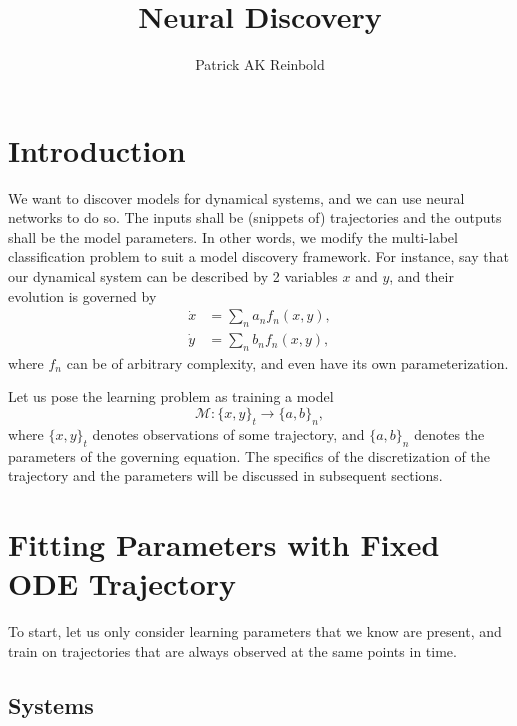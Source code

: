 \documentclass{article}
\title{Neural Discovery}
\date{}
\author{Patrick AK Reinbold}
\begin{document}
\maketitle

\section{Introduction}

We want to discover models for dynamical systems, and we can use neural networks to do so. The inputs shall be (snippets of) trajectories and the outputs shall be the model parameters. In other words, we modify the multi-label classification problem to suit a model discovery framework. For instance, say that our dynamical system can be described by 2 variables $x$ and $y$, and their evolution is governed by
\begin{align}
    \dot{x} & = \sum_n a_n f_n(x, y), \nonumber\\
    \dot{y} & = \sum_n b_n f_n(x, y),
\end{align}
where $f_n$ can be of arbitrary complexity, and even have its own parameterization.

Let us pose the learning problem as training a model 
\begin{equation}
    \mathcal{M}: \{x, y\}_t \to \{a, b\}_n,
\end{equation}
where $\{x,y\}_t$ denotes observations of some trajectory, and $\{a,b\}_n$ denotes the parameters of the governing equation. The specifics of the discretization of the trajectory and the parameters will be discussed in subsequent sections.

\section{Fitting Parameters with Fixed ODE Trajectory}

To start, let us only consider learning parameters that we know are present, and train on trajectories that are always observed at the same points in time.

\subsection{Systems}
\end{document}
